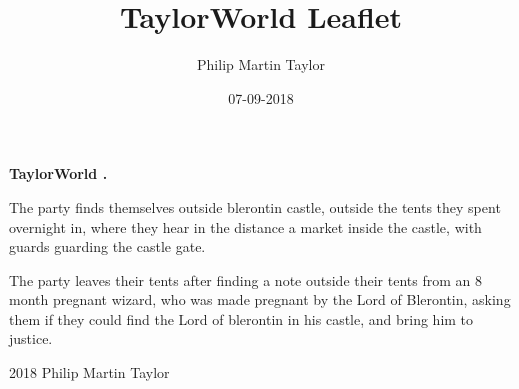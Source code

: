 \documentclass[12pt,a4paper]{book}
\date{07-09-2018}
\author{Philip Martin Taylor}
\title{TaylorWorld Leaflet}
\begin{document}
\begin{center}
\textbf{TaylorWorld \texttrademark.}
\end{center}
\begin{flushleft}
  The party finds themselves outside blerontin castle, outside the tents they spent overnight in, where they hear in the distance a market inside the castle, with guards guarding the castle gate. 
\end{flushleft}
\begin{flushleft}
  The party leaves their tents after finding a note outside their tents from an 8 month pregnant wizard, who was made pregnant by the Lord of Blerontin, asking them if they could find the Lord of blerontin in his castle, and bring him to justice.
\end{flushleft}
\begin{center}
  \textcopyright{} 2018 Philip Martin Taylor
\end{center}
\end{document}
